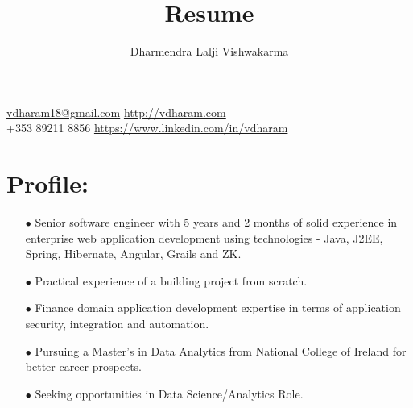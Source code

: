 \documentclass{article}
\makeatletter
\renewcommand{\maketitle}{
\begin{center}
{\LARGE\bfseries
\theauthor}

\vspace{0.35em}
\faEnvelope{} \href{mailto:vdharam18@gmail.com}{vdharam18@gmail.com} \hfill \faGlobe{} \href{http://vdharam.com}{http://vdharam.com}
\vspace{0.25em}\\
\faPhone{} +353 89211 8856 \hfill \faLinkedinSquare{} \href{https://www.linkedin.com/in/vdharam}{https://www.linkedin.com/in/vdharam}
\end{center}	
}
\makeatother
\begin{document}
\title{Resume}
\author{Dharmendra Lalji Vishwakarma}
\maketitle

\section{\faBriefcase{} Profile:}
\begin{itemize}
\itemsep0em
\item[$\bullet$]
Senior software engineer with 5 years and 2 months of solid experience in enterprise web application development using technologies - Java, J2EE, Spring, Hibernate, Angular, Grails and ZK.
\item[$\bullet$]
Practical experience of a building project from scratch.
\item[$\bullet$]
Finance domain application development expertise in terms of application security, integration and automation.
\item[$\bullet$]
Pursuing a Master's in Data Analytics from National College of Ireland for better career prospects.
\item[$\bullet$]
Seeking opportunities in Data Science/Analytics Role.
\end{itemize}
\end{document}
